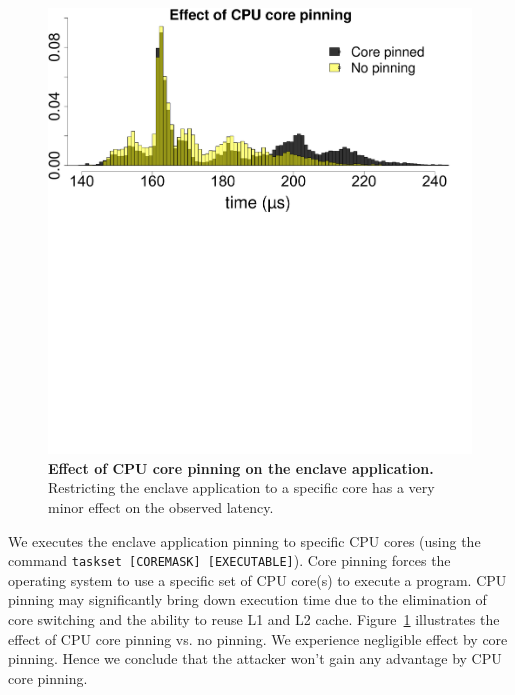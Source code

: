 \begin{figure}[t]
  \centering
    \includegraphics[trim={0 18cm 1.8cm 0}, clip, width=0.75\linewidth]{chapters/ProximiTEE/data/CPU_stress/plot_pin_1.pdf}
    \caption[Effect of CPU core pinning on the enclave application]{\textbf{Effect of CPU core pinning on the enclave application.} Restricting the enclave application to a specific core has a very minor effect on the observed latency.}
    \label{graph:cpuPin}
\end{figure}

 We executes the \name enclave application pinning to specific CPU cores (using the command \texttt{taskset [COREMASK] [EXECUTABLE]}). Core pinning forces the operating system to use a specific set of CPU core(s) to execute a program. CPU pinning may significantly bring down execution time due to the elimination of core switching and the ability to reuse L1 and L2 cache. Figure~\ref{graph:cpuPin} illustrates the effect of CPU core pinning vs. no pinning. We experience negligible effect by core pinning. Hence we conclude that the attacker won't gain any advantage by CPU core pinning.

